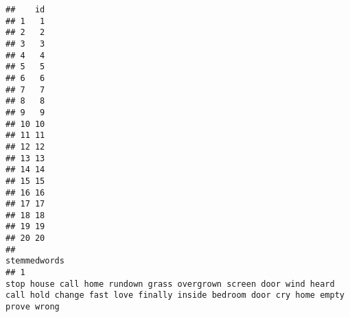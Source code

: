 \documentclass[]{article}
\begin{document}
\begin{verbatim}
##    id
## 1   1
## 2   2
## 3   3
## 4   4
## 5   5
## 6   6
## 7   7
## 8   8
## 9   9
## 10 10
## 11 11
## 12 12
## 13 13
## 14 14
## 15 15
## 16 16
## 17 17
## 18 18
## 19 19
## 20 20
##                                                                                                                                                                                                                                                                                                                                                                                                                                                                                                                                                                                                                                                                                                                                                                                                                                                                                                                                                                                                                                                                                                                                                                                                                               stemmedwords
## 1                                                                                                                                                                                                                                                                                                                                                                                                                                                                                                                                                                                                                                                                                                                                                                                                                                                                                                                                                                                                                                                                                    stop house call home rundown grass overgrown screen door wind heard call hold change fast love finally inside bedroom door cry home empty prove wrong

\end{verbatim}
\end{document}
